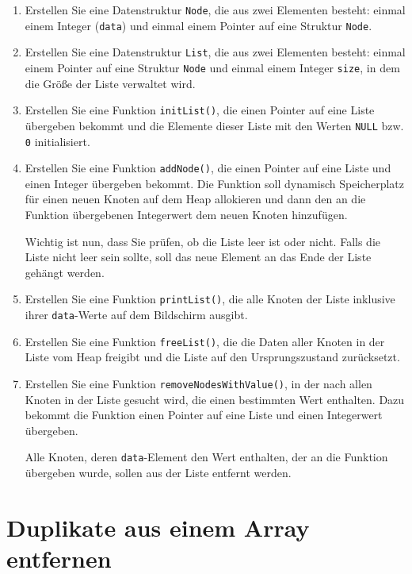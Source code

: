 \begin{enumerate}
    \item Erstellen Sie eine Datenstruktur \texttt{Node}, die aus zwei
    Elementen besteht: einmal einem Integer (\texttt{data}) und einmal
    einem Pointer auf eine Struktur \texttt{Node}.
    \item Erstellen Sie eine Datenstruktur \texttt{List}, die aus zwei
    Elementen besteht: einmal einem Pointer auf eine Struktur
    \texttt{Node} und einmal einem Integer \texttt{size}, in dem
    die Größe der Liste verwaltet wird.
    \item Erstellen Sie eine Funktion \texttt{initList()}, die einen
    Pointer auf eine Liste übergeben bekommt und die Elemente dieser Liste mit
    den Werten \texttt{NULL} bzw. \texttt{0} initialisiert.
    \item Erstellen Sie eine Funktion \texttt{addNode()}, die einen
    Pointer auf eine Liste und einen Integer übergeben bekommt. Die Funktion
    soll dynamisch Speicherplatz für einen neuen Knoten auf dem Heap allokieren
    und dann den an die Funktion übergebenen Integerwert dem neuen Knoten
    hinzufügen.

    Wichtig ist nun, dass Sie prüfen, ob die Liste leer ist oder nicht. Falls
    die Liste nicht leer sein sollte, soll das neue Element an das Ende der
    Liste gehängt werden.
    \item Erstellen Sie eine Funktion \texttt{printList()}, die alle
    Knoten der Liste inklusive ihrer \texttt{data}-Werte auf dem
    Bildschirm ausgibt.
    \item Erstellen Sie eine Funktion \texttt{freeList()}, die die Daten
    aller Knoten in der Liste vom Heap freigibt und die Liste auf den
    Ursprungszustand zurücksetzt.
    \item Erstellen Sie eine Funktion \texttt{removeNodesWithValue()}, in
    der nach allen Knoten in der Liste gesucht wird, die einen bestimmten Wert
    enthalten. Dazu bekommt die Funktion einen Pointer auf eine Liste und einen
    Integerwert übergeben.

    Alle Knoten, deren \texttt{data}-Element den Wert enthalten, der an
    die Funktion übergeben wurde, sollen aus der Liste entfernt werden.
\end{enumerate}






\chapter{Duplikate aus einem Array entfernen}


